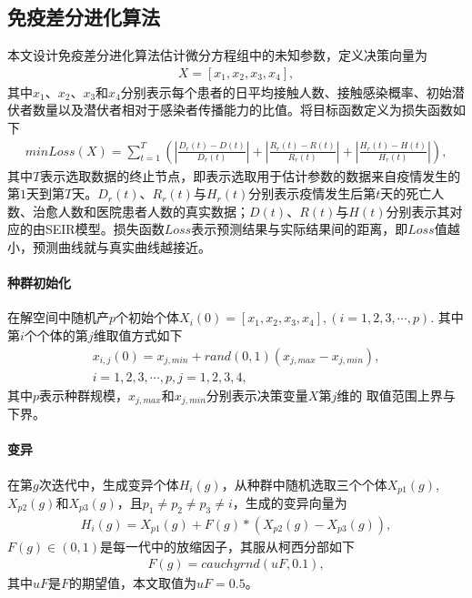 \documentclass{whutmod}
\begin{document}
		\subsection{免疫差分进化算法}
		本文设计免疫差分进化算法估计微分方程组中的未知参数，定义决策向量为
		\begin{gather}
		X=[x_1,x_2,x_3,x_4],
		\end{gather}
		其中$x_1$、$x_2$、$x_3$和$x_4$分别表示每个患者的日平均接触人数、接触感染概率、初始潜伏者数量以及潜伏者相对于感染者传播能力的比值。将目标函数定义为损失函数如下
		\begin{gather}
		min Loss(X)=\sum_{t=1}^T (|\frac{D_r(t)-D(t)}{D_r(t)}|+|\frac{R_r(t)-R(t)}{R_r(t)}|+|\frac{H_r(t)-H(t)}{H_r(t)}|),
		\end{gather}
		其中$T$表示选取数据的终止节点，即表示选取用于估计参数的数据来自疫情发生的第$1$天到第$T$天。$D_r(t)$、$R_r(t)$与$H_r(t)$分别表示疫情发生后第$t$天的死亡人数、治愈人数和医院患者人数的真实数据；$D(t)$、$R(t)$与$H(t)$分别表示其对应的由SEIR模型。损失函数$Loss$表示预测结果与实际结果间的距离，即$Loss$值越小，预测曲线就与真实曲线越接近。
		\paragraph{种群初始化}
		在解空间中随机产$p$个初始个体$
		X_i(0)=[x_1,x_2,x_3,x_4],(i=1,2,3,\cdots,p).
		$
		其中第$i$个个体的第$j$维取值方式如下
		\begin{gather*}
		x_{i,j}(0)=x_{j,min}+rand(0,1)(x_{j,max}-x_{j,min}),\\i=1,2,3,\cdots,p,j=1,2,3,4,
		\end{gather*}
		其中$p$表示种群规模，$x_{j,max}$和$x_{j,min}$分别表示决策变量$X$第$j$维的
		取值范围上界与下界。
		\paragraph{变异}
		在第$g$次迭代中，生成变异个体$H_i(g)$，从种群中随机选取三个个体$X_{p1}(g)$,$X_{p2}(g)$和$X_{p3}(g)$，且$p_1\neq p_2\neq p_3\neq i$，生成的变异向量为
	    \begin{gather*}
	    H_i(g)=X_{p1}(g)+F(g)*(X_{p2}(g)-X_{p3}(g)),
	    \end{gather*}
	    $F(g)\in (0,1)$是每一代中的放缩因子，其服从柯西分部如下
	    \begin{gather*}
	    F(g)=cauchyrnd(uF,0.1),
	    \end{gather*}
	   其中$uF$是$F$的期望值，本文取值为$uF=0.5$。
\end{document}
